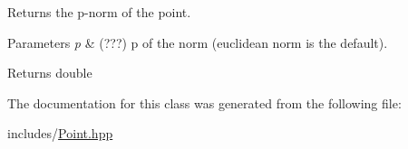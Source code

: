 Returns the p-\/norm of the point. 


\begin{DoxyParams}{Parameters}
{\em p} & (???) p of the norm (euclidean norm is the default). \\
\hline
\end{DoxyParams}
\begin{DoxyReturn}{Returns}
double 
\end{DoxyReturn}


The documentation for this class was generated from the following file\+:\begin{DoxyCompactItemize}
\item 
includes/\hyperlink{_point_8hpp}{Point.\+hpp}\end{DoxyCompactItemize}
